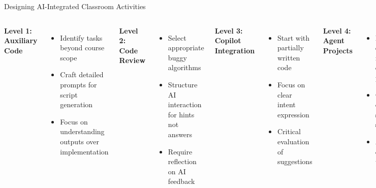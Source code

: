 \documentclass{beamer}
\begin{document}
\begin{frame}{Designing AI-Integrated Classroom Activities}
    \begin{columns}
        \textbf{Level 1: Auxiliary Code}
        \begin{itemize}
            \item Identify tasks beyond course scope
            \item Craft detailed prompts for script generation
            \item Focus on understanding outputs over implementation
        \end{itemize}
        
        \textbf{Level 2: Code Review}
        \begin{itemize}
            \item Select appropriate buggy algorithms
            \item Structure AI interaction for hints not answers
            \item Require reflection on AI feedback
        \end{itemize}
        
        \textbf{Level 3: Copilot Integration}
        \begin{itemize}
            \item Start with partially written code
            \item Focus on clear intent expression
            \item Critical evaluation of suggestions
        \end{itemize}
        
        \textbf{Level 4: Agent Projects}
        \begin{itemize}
            \item Define complex, multi-component projects
            \item Create detailed system specifications
            \item Assess system design understanding
        \end{itemize}
    \end{columns}
\end{frame}
\end{document}
